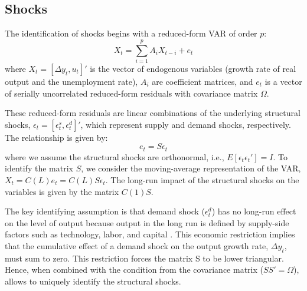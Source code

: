 \documentclass[12pt, a4paper]{article}
\begin{document}
\subsection{Shocks} 
The identification of shocks begins with a reduced-form VAR of order $p$:
\begin{equation} \label{eq:var_reduced}
X_t = \sum_{i=1}^{p} A_i X_{t-i} + e_t
\end{equation}
where $X_t = [\Delta y_t, u_t]'$ is the vector of endogenous variables (growth rate of real output and the unemployment rate), $A_i$ are coefficient matrices, and $e_t$ is a vector of serially uncorrelated reduced-form residuals with covariance matrix $\Omega$.

These reduced-form residuals are linear combinations of the underlying structural shocks, $\epsilon_t = [\epsilon^s_t, \epsilon^d_t]'$, which represent supply and demand shocks, respectively. The relationship is given by:
\begin{equation} \label{eq:shocks_relation}
e_t = S\epsilon_t
\end{equation}
where we assume the structural shocks are orthonormal, i.e., $E[\epsilon_t \epsilon_t'] = I$. To identify the matrix $S$, we consider the moving-average representation of the VAR, $X_t = C(L)e_t = C(L)S\epsilon_t$. The long-run impact of the structural shocks on the variables is given by the matrix $C(1)S$.

The key identifying assumption is that demand shock ($\epsilon^d_t$) has no long-run effect on the level of output because output in the long run is defined by supply-side factors such as technology, labor, and capital \parencite{blanchard1989dynamic}. This economic restriction implies that the cumulative effect of a demand shock on the output growth rate, $\Delta y_t$, must sum to zero. This restriction forces the matrix S to be lower triangular. Hence, when combined with the condition from the covariance matrix ($SS' = \Omega$), allows to uniquely identify the structural shocks.
\end{document}
